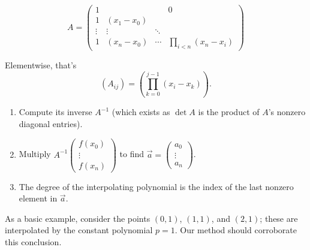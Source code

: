 \documentclass{article}
\begin{document}
\[A = \begin{pmatrix} 1 & & & 0\\
                       1 &(x_1 - x_0) & & \\
                       \vdots & \vdots & \ddots & \\
                       1 &(x_n - x_0) &\cdots &\prod_{i<n}(x_n - x_i)
       \end{pmatrix}\]

Elementwise, that's
\[(A_{ij}) = \left(\prod_{k=0}^{j-1} (x_i - x_k)\right).\]

\begin{enumerate}
\def\labelenumi{\arabic{enumi}.}
\setcounter{enumi}{1}
\item
  Compute its inverse \(A^{-1}\) (which exists as \(\det A\) is the
  product of \(A\)'s nonzero diagonal entries).
\item
  Multiply
  \(A^{-1} \begin{pmatrix}f(x_0)\\ \vdots\\ f(x_n)\end{pmatrix}\) to
  find \(\vec{a} = \begin{pmatrix}a_0\\ \vdots\\ a_n\end{pmatrix}\).
\item
  The degree of the interpolating polynomial is the index of the last
  nonzero element in \(\vec{a}\).
\end{enumerate}

As a basic example, consider the points \((0,1)\), \((1,1)\), and
\((2,1)\); these are interpolated by the constant polynomial \(p = 1\).
Our method should corroborate this conclusion.
\end{document}
